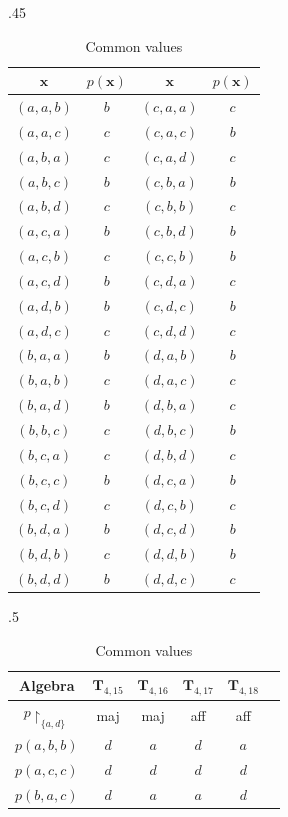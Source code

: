 \documentclass[11pt]{amsart}
\theoremstyle{definition}
\theoremstyle{remark}
\theoremstyle{plain}
\def\T{\mathbf{T}}
\begin{document}
\begin{table}[H]
\begin{subtable}{.45\linewidth}
    \centering
    \begin{tabular}{c c|c c}
    $\mathbf{x}$ & $p(\mathbf{x})$ &$\mathbf{x}$  & $p(\mathbf{x})$\\ \hline\hline
     $(a,a,b)$ & $b$ & $(c,a,a)$ & $c$ \\
     $(a,a,c)$ & $c$ & $(c,a,c)$ & $b$\\
     $(a,b,a)$ & $c$ & $(c,a,d)$ & $c$ \\
     $(a,b,c)$ & $b$ & $(c,b,a)$ & $b$\\
     $(a,b,d)$ & $c$ & $(c,b,b)$ & $c$ \\
     $(a,c,a)$ & $b$ & $(c,b,d)$ & $b$ \\
     $(a,c,b)$ & $c$ & $(c,c,b)$ & $b$ \\
     $(a,c,d)$ & $b$ & $(c,d,a)$ & $c$ \\
     $(a,d,b)$ & $b$ & $(c,d,c)$ & $b$ \\
     $(a,d,c)$ & $c$ & $(c,d,d)$ & $c$ \\[1ex]
     $(b,a,a)$ & $b$ & $(d,a,b)$ & $b$ \\
     $(b,a,b)$ & $c$ & $(d,a,c)$ & $c$ \\
     $(b,a,d)$ & $b$ & $(d,b,a)$ & $c$ \\
     $(b,b,c)$ & $c$ & $(d,b,c)$ & $b$ \\
     $(b,c,a)$ & $c$ & $(d,b,d)$ & $c$ \\
     $(b,c,c)$ & $b$ & $(d,c,a)$ & $b$ \\
     $(b,c,d)$ & $c$ & $(d,c,b)$ & $c$ \\
     $(b,d,a)$ & $b$ & $(d,c,d)$ & $b$ \\
     $(b,d,b)$ & $c$ & $(d,d,b)$ & $b$ \\
     $(b,d,d)$ & $b$ & $(d,d,c)$ & $c$     
\end{tabular}
    \caption{Common values}
    \label{3affcommon}
\end{subtable}
\begin{subtable}{.5\linewidth}
\centering
 \begin{tabular}{|c||c|c|c|c|c|}
\hline
    Algebra & $\T_{4,15}$ & $\T_{4,16}$ & $\T_{4,17}$ & $\T_{4,18}$ \\
\hline\hline
     $p{\restriction_{\{a,d\}}}$  & maj & maj & aff & aff \\
\hline
    $p(a,b,b)$  & $d$ & $a$ & $d$ & $a$ \\
\hline
	$p(a,c,c)$ & $d$ & $d$ & $d$ & $d$ \\
\hline
	$p(b,a,c)$ & $d$ & $a$ & $a$ & $d$ \\	
\hline


\end{tabular}
\end{subtable}
\end{table}
\end{document}

